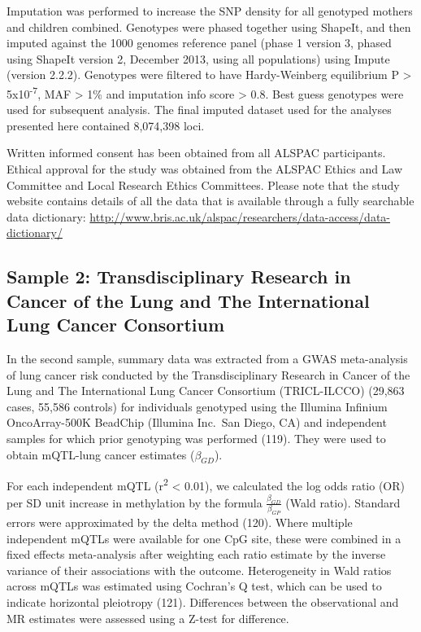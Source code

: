 \documentclass[11pt,twoside]{bristolthesis}
\begin{document}
Imputation was performed to increase the SNP density for all genotyped mothers and children combined. Genotypes were phased together using ShapeIt, and then imputed against the 1000 genomes reference panel (phase 1 version 3, phased using ShapeIt version 2, December 2013, using all populations) using Impute (version 2.2.2). Genotypes were filtered to have Hardy-Weinberg equilibrium P \textgreater{} 5x10\textsuperscript{-7}, MAF \textgreater{} 1\% and imputation info score \textgreater{} 0.8. Best guess genotypes were used for subsequent analysis. The final imputed dataset used for the analyses presented here contained 8,074,398 loci.

Written informed consent has been obtained from all ALSPAC participants. Ethical approval for the study was obtained from the ALSPAC Ethics and Law Committee and Local Research Ethics Committees.
Please note that the study website contains details of all the data that is available through a fully searchable data dictionary: \url{http://www.bris.ac.uk/alspac/researchers/data-access/data-dictionary/}

\hypertarget{sample-2-transdisciplinary-research-in-cancer-of-the-lung-and-the-international-lung-cancer-consortium}{%
\subsection{Sample 2: Transdisciplinary Research in Cancer of the Lung and The International Lung Cancer Consortium}\label{sample-2-transdisciplinary-research-in-cancer-of-the-lung-and-the-international-lung-cancer-consortium}}

In the second sample, summary data was extracted from a GWAS meta-analysis of lung cancer risk conducted by the Transdisciplinary Research in Cancer of the Lung and The International Lung Cancer Consortium (TRICL-ILCCO) (29,863 cases, 55,586 controls) for individuals genotyped using the Illumina Infinium OncoArray-500K BeadChip (Illumina Inc.~San Diego, CA) and independent samples for which prior genotyping was performed (119). They were used to obtain mQTL-lung cancer estimates (\(\beta_{GD}\)).

For each independent mQTL (r\textsuperscript{2} \textless{} 0.01), we calculated the log odds ratio (OR) per SD unit increase in methylation by the formula \(\frac{\beta_{GD}} {\beta_{GP}}\) (Wald ratio). Standard errors were approximated by the delta method (120). Where multiple independent mQTLs were available for one CpG site, these were combined in a fixed effects meta-analysis after weighting each ratio estimate by the inverse variance of their associations with the outcome. Heterogeneity in Wald ratios across mQTLs was estimated using Cochran's Q test, which can be used to indicate horizontal pleiotropy (121). Differences between the observational and MR estimates were assessed using a Z-test for difference.
\end{document}
